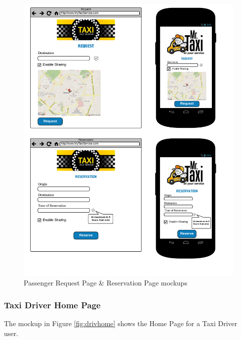 \begin{figure}[htbp]
\centering
\includegraphics[width=\textwidth]{cpt/img/PassReqRes}
\caption{Passenger Request Page \& Reservation Page mockups}
\label{fig:reqres}
\end{figure}

\subsubsection{Taxi Driver Home Page}
The mockup in Figure \ref{fig:drivhome} shows the Home Page for a Taxi Driver user.

